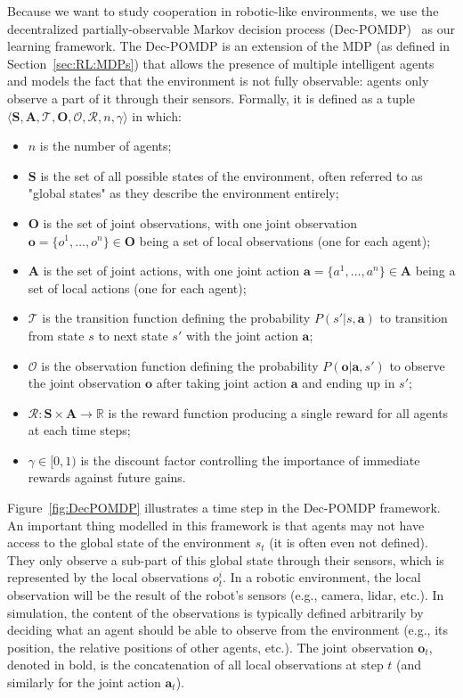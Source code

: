 Because we want to study cooperation in robotic-like environments, we use the decentralized partially-observable Markov decision process (Dec-POMDP)~\citep{Oliehoek2016_DecPOMDP} as our learning framework. The Dec-POMDP is an extension of the MDP (as defined in Section~\ref{sec:RL:MDPs}) that allows the presence of multiple intelligent agents and models the fact that the environment is not fully observable: agents only observe a part of it through their sensors. Formally, it is defined as a tuple $\langle\mathbf{S},\mathbf{A},\mathcal{T},\mathbf{O},\mathcal{O},\mathcal{R},n,\gamma\rangle$ in which:
\begin{itemize}
    \item $n$ is the number of agents;
    \item $\mathbf{S}$ is the set of all possible states of the environment, often referred to as "global states" as they describe the environment entirely;
    \item $\mathbf{O}$ is the set of joint observations, with one joint observation $\mathbf{o}=\{o^1,...,o^n\}\in\mathbf{O}$ being a set of local observations (one for each agent);
    \item $\mathbf{A}$ is the set of joint actions, with one joint action $\mathbf{a}=\{a^1,...,a^n\}\in\mathbf{A}$ being a set of local actions (one for each agent);
    \item $\mathcal{T}$ is the transition function defining the probability $P(s'|s,\mathbf{a})$ to transition from state $s$ to next state $s'$ with the joint action $\mathbf{a}$;
    \item $\mathcal{O}$ is the observation function defining the probability $P(\mathbf{o}|\mathbf{a},s')$ to observe the joint observation $\mathbf{o}$ after taking joint action $\mathbf{a}$ and ending up in $s'$;
    \item $\mathcal{R}:\mathbf{S}\times\mathbf{A}\rightarrow\mathbb{R}$ is the reward function producing a single reward for all agents at each time steps;
    \item $\gamma\in[0,1)$ is the discount factor controlling the importance of immediate rewards against future gains.
\end{itemize}
Figure~\ref{fig:DecPOMDP} illustrates a time step in the Dec-POMDP framework. An important thing modelled in this framework is that agents may not have access to the global state of the environment $s_t$ (it is often even not defined). They only observe a sub-part of this global state through their sensors, which is represented by the local observations $o^i_t$. In a robotic environment, the local observation will be the result of the robot's sensors (e.g., camera, lidar, etc.). In simulation, the content of the observations is typically defined arbitrarily by deciding what an agent should be able to observe from the environment (e.g., its position, the relative positions of other agents, etc.). The joint observation $\mathbf{o}_t$, denoted in bold, is the concatenation of all local observations at step $t$ (and similarly for the joint action $\mathbf{a}_t$). 


